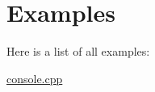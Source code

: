 \section{Examples}
Here is a list of all examples\-:\begin{DoxyCompactItemize}
\item 
\hyperlink{console_8cpp-example}{console.\-cpp}
\end{DoxyCompactItemize}
